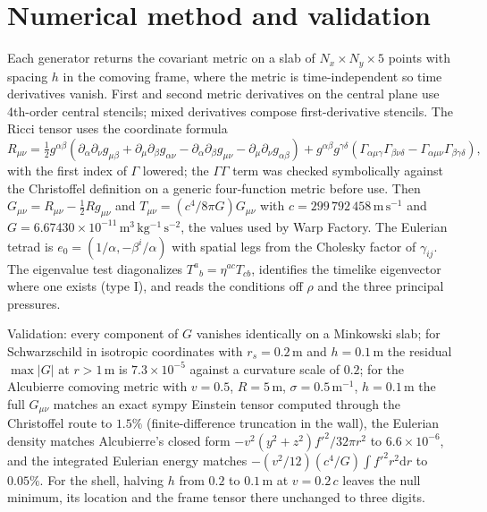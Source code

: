 \documentclass[11pt,a4paper]{article}
\theoremstyle{remark}
\newcommand{\dd}{\mathrm{d}}
\begin{document}
\appendix
\section{Numerical method and validation}\label{app:num}

Each generator returns the covariant metric on a slab of $N_x\times N_y\times5$ points with spacing $h$ in the comoving frame, where the metric is time-independent so time derivatives vanish. First and second metric derivatives on the central plane use 4th-order central stencils; mixed derivatives compose first-derivative stencils. The Ricci tensor uses the coordinate formula
\begin{equation}
R_{\mu\nu} = \tfrac12 g^{\alpha\beta}\left(\partial_\alpha\partial_\nu g_{\mu\beta} + \partial_\mu\partial_\beta g_{\alpha\nu} - \partial_\alpha\partial_\beta g_{\mu\nu} - \partial_\mu\partial_\nu g_{\alpha\beta}\right) + g^{\alpha\beta}g^{\gamma\delta}\left(\Gamma_{\alpha\mu\gamma}\Gamma_{\beta\nu\delta} - \Gamma_{\alpha\mu\nu}\Gamma_{\beta\gamma\delta}\right),
\end{equation}
with the first index of $\Gamma$ lowered; the $\Gamma\Gamma$ term was checked symbolically against the Christoffel definition on a generic four-function metric before use. Then $G_{\mu\nu} = R_{\mu\nu} - \tfrac12Rg_{\mu\nu}$ and $T_{\mu\nu} = (c^4/8\pi G)G_{\mu\nu}$ with $c = 299\,792\,458\,\mathrm{m\,s^{-1}}$ and $G = 6.67430\times10^{-11}\,\mathrm{m^3\,kg^{-1}\,s^{-2}}$, the values used by Warp Factory. The Eulerian tetrad is $e_0 = (1/\alpha, -\beta^i/\alpha)$ with spatial legs from the Cholesky factor of $\gamma_{ij}$. The eigenvalue test diagonalizes $T^a{}_b = \eta^{ac}T_{cb}$, identifies the timelike eigenvector where one exists (type I), and reads the conditions off $\rho$ and the three principal pressures.

Validation: every component of $G$ vanishes identically on a Minkowski slab; for Schwarzschild in isotropic coordinates with $r_s = 0.2\,\mathrm{m}$ and $h = 0.1\,\mathrm{m}$ the residual $\max|G|$ at $r > 1\,\mathrm{m}$ is $7.3\times10^{-5}$ against a curvature scale of $0.2$; for the Alcubierre comoving metric with $v = 0.5$, $R = 5\,\mathrm{m}$, $\sigma = 0.5\,\mathrm{m^{-1}}$, $h = 0.1\,\mathrm{m}$ the full $G_{\mu\nu}$ matches an exact sympy Einstein tensor computed through the Christoffel route to $1.5\%$ (finite-difference truncation in the wall), the Eulerian density matches Alcubierre's closed form $-v^2(y^2+z^2)f'^2/32\pi r^2$ to $6.6\times10^{-6}$, and the integrated Eulerian energy matches $-(v^2/12)(c^4/G)\int f'^2r^2\dd r$ to $0.05\%$. For the shell, halving $h$ from $0.2$ to $0.1\,\mathrm{m}$ at $v = 0.2\,c$ leaves the null minimum, its location and the frame tensor there unchanged to three digits.
\end{document}

